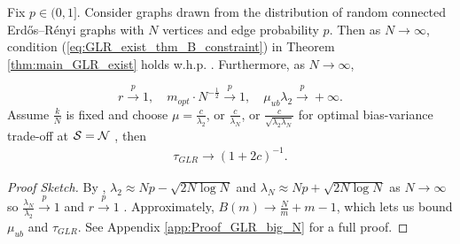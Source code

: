 \begin{propn}
\label{propn:GLR_big_N_app}
Fix $p \in (0,1]$. Consider graphs drawn from the distribution of random connected Erdős–Rényi graphs with $N$ vertices and edge probability $p$. Then as $N \to \infty$, condition (\ref{eq:GLR_exist_thm_B_constraint}) in Theorem \ref{thm:main_GLR_exist} holds w.h.p. . Furthermore, as $N \to \infty$,

    \begin{equation}    
        r \overset{p}{\to} 1, \quad
         {m_{opt}}\cdot {{N}}^{-\frac{1}{2}} \overset{p}{\to} 1, \quad
       \mu_{ub}\lambda_{2} \overset{p}{\to} +\infty. 
    \end{equation}
    Assume $\frac{k}{N}$ is fixed and choose $\mu = \frac{c}{\lambda_{2}}$,  or $\frac{c}{\lambda_{N}}$, or $\frac{c}{\sqrt{\lambda_{2}\lambda_{N}} }$ for optimal bias-variance trade-off 
 at $\mathcal{S} = \mathcal{N}$ \cite{chen2017GLRbias}, then
    \begin{align}
        \tau_{GLR} \to \left(1+2c\right)^{-1}.
    \end{align}
\end{propn}
\begin{proof}[Proof Sketch]
By \cite[Theorem 1]{jiang2012low}, $\lambda_{2} \approx Np - \sqrt{2N\log N}$ and $\lambda_{N} \approx Np + \sqrt{2N\log N}$ as $N \to \infty$ so $\frac{\lambda_{N}}{\lambda_{2}} \overset{p}{\to} 1$ and $r \overset{p}{\to} 1$ . Approximately, $B(m) \to \frac{N}{m} + m - 1$, which lets us bound $\mu_{ub}$ and $\tau_{GLR}$.  See Appendix \ref {app:Proof_GLR_big_N} for a full proof.
\end{proof}

